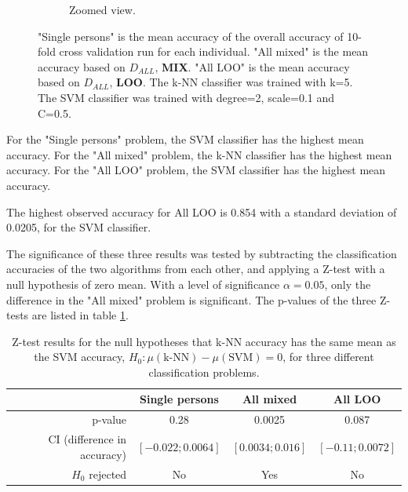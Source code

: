 \begin{figure}[ht]
\begin{subfigure}{\figscale}
\caption[k-NN and SVM classification accuracies, zoomed view.]
{
Zoomed view.
}
\label{fig:knn-vs-svm-zoomed}
\end{subfigure}
\caption[k-NN and SVM classification accuracies]{
"Single persons" is the mean accuracy of the overall accuracy of 10-fold cross validation run for each individual.
"All mixed" is the mean accuracy based on $D_{ALL}$, \textbf{MIX}.
"All LOO" is the mean accuracy based on $D_{ALL}$, \textbf{LOO}.
The k-NN classifier was trained with k=5. The SVM classifier was trained with degree=2, scale=0.1 and C=0.5.
}
\end{figure}

For the "Single persons" problem, the SVM classifier has the highest mean accuracy.
For the "All mixed" problem, the k-NN classifier has the highest mean accuracy.
For the "All LOO" problem, the SVM classifier has the highest mean accuracy.

The highest observed accuracy for All LOO is 0.854 with a standard
deviation of 0.0205, for the SVM classifier.

The significance of these three results was tested by subtracting the classification
accuracies of the two algorithms from each other,
and applying a Z-test with a null hypothesis of zero mean.
With a level of significance \(\alpha=0.05\),
only the difference in the "All mixed" problem is significant.
The p-values of the three Z-tests are listed in table \ref{tb:ztest}.
\begin{table}[ht]
\centering
\caption[Z-test results]
{
Z-test results for the null hypotheses that k-NN accuracy has
the same mean as the SVM accuracy, \(H_0:\mu\left(\text{k-NN}\right)-\mu\left(\text{SVM}\right)=0\), for three different classification problems.
}
\begin{tabular}{|r||c|c|c|}
\hline
 & Single persons & All mixed & All LOO
 \\
 \hline
p-value & 0.28 & 0.0025 & 0.087
\\
CI (difference in accuracy)& \(\left[-0.022;0.0064\right]\)
& \(\left[0.0034;0.016\right]\)
& \(\left[-0.11;0.0072\right]\)
\\
\(H_0\) rejected & No & Yes & No
\\
\hline
\end{tabular}
\label{tb:ztest}
\end{table}


